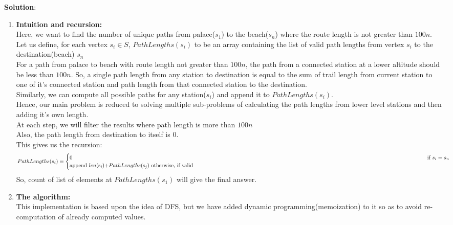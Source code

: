\documentclass[12pt]{article}
\begin{document}
\begin{enumerate}
\begin{enumerate}
\textbf{Solution}:
\begin{enumerate}
\item  \textbf{Intuition and recursion:}\\
Here, we want to find the number of unique paths from palace($s_1$) to the beach($s_n$) where the route length is not greater than $100n$.\\
Let us define, for each vertex ${s_i \in S}$, $PathLengths(s_i)$ to be an array containing the list of valid path lengths from vertex $s_i$ to the destination(beach) $s_n$\\
For a path from palace to beach with route length not greater than $100n$, the path from a connected station at a lower altitude should be less than $100n$.
So, a single path length from any station to destination is equal to the sum of trail length from current station to one of it's connected station and path length from that connected station to the destination.\\
Similarly, we can compute all possible paths for any station($s_i$) and append it to $PathLengths(s_i)$.\\
Hence, our main problem is reduced to solving multiple sub-problems of calculating the path lengths from lower level stations and then adding it's own length. \\
At each step, we will filter the results where path length is more than $100n$\\
Also, the path length from destination to itself is 0. \\
This gives us the recursion: 
\begin{equation*}
PathLengths(s_i) = 
\begin{cases}
0  \verb|		| \verb|		| \verb|		| \verb|		| \verb|		| \verb|		| \verb|		| \verb|		| \verb|		| \verb|		| \verb|		| \verb|		| \verb|		| \verb|		| \verb|             |\text{  if  $s_i = s_n$} \\
\text {append } len($s$_i$)$ + PathLengths($s$_j$)$ \text{  otherwise, if valid}\\ 
\end{cases}
\end{equation*}	
So, count of list of elements at $PathLengths(s_1)$ will give the final answer.\\
\item  \textbf{The algorithm:}\\
This implementation is based upon the idea of DFS, but we have added dynamic programming(memoization) to it so as to avoid re-computation of already computed values.\\

\end{enumerate}
\end{enumerate}
\end{enumerate}
\end{document}
